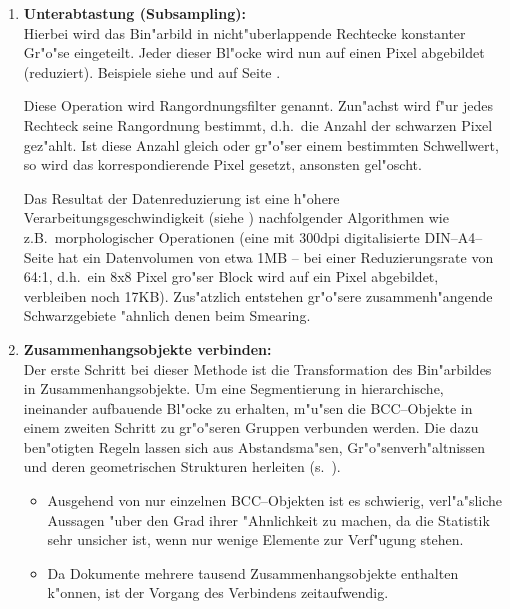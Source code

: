 \begin{enumerate}

  \item {\bf Unterabtastung (Subsampling):}\\
        Hierbei wird das Bin"arbild in nicht"uberlappende Rechtecke
        konstanter Gr"o"se eingeteilt. Jeder dieser Bl"ocke wird nun auf einen Pixel abgebildet
        (reduziert). Beispiele siehe  und  auf Seite
        \pageref{eps:Subsampling}.\label{Subsampling}

        Diese Operation wird Rangordnungsfilter genannt. Zun"achst wird f"ur jedes Rechteck seine
        Rangordnung bestimmt, d.h.\ die Anzahl der schwarzen Pixel gez"ahlt. Ist diese
        Anzahl gleich oder gr"o"ser einem bestimmten Schwellwert, so wird das korrespondierende Pixel
        gesetzt, ansonsten gel"oscht.

        Das Resultat der Datenreduzierung ist eine
        h"ohere Verarbeitungsgeschwindigkeit (siehe ) nachfolgender
        Algorithmen wie z.B.\ morphologischer Operationen
        (eine mit 300dpi digitalisierte DIN--A4--Seite hat
        ein Datenvolumen von etwa 1MB -- bei einer Reduzierungsrate von 64:1, d.h.\ ein 8x8 Pixel gro"ser
        Block wird auf ein Pixel abgebildet, verbleiben noch 17KB).
        Zus"atzlich entstehen gr"o"sere
        zusammenh"angende Schwarzgebiete "ahnlich denen beim Smearing.


  \item {\bf Zusammenhangsobjekte verbinden:}\\
        Der erste Schritt bei dieser Methode ist die Transformation des Bin"arbildes in
        Zusammenhangsobjekte. Um eine Segmentierung in hierarchische,
        ineinander aufbauende Bl"ocke zu erhalten, m"u"sen die BCC--Objekte in einem zweiten Schritt
        zu gr"o"seren Gruppen verbunden werden. Die dazu ben"otigten Regeln lassen sich aus Abstandsma"sen,
        Gr"o"senverh"altnissen und deren geometrischen Strukturen herleiten (s.\ ).

        \begin{itemize}
          \item Ausgehend von nur einzelnen BCC--Objekten ist es schwierig, verl"a"sliche Aussagen
                "uber den Grad ihrer "Ahnlichkeit zu machen, da die Statistik sehr unsicher ist, wenn
                nur wenige Elemente zur Verf"ugung stehen.
          \item Da Dokumente mehrere tausend Zusammenhangsobjekte enthalten k"onnen, ist
                der Vorgang des Verbindens zeitaufwendig.
        \end{itemize}

\end{enumerate}

